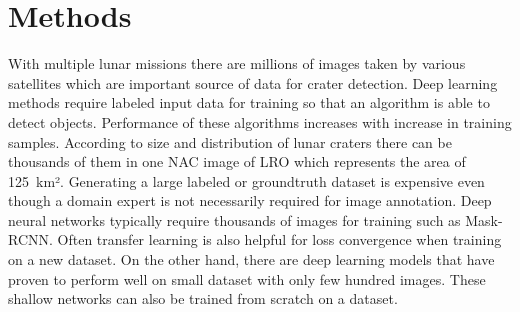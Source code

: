 \documentclass[11pt]{article}
\begin{document}




\section{Methods}
With multiple lunar missions there are millions of images taken by various satellites which are important source of data for crater detection. Deep learning methods require labeled input data for training so that an algorithm is able to detect objects. Performance of these algorithms increases with increase in training samples. According to size and distribution of lunar craters there can be thousands of them in one NAC image of LRO which represents the area of \SI{125}{km}². Generating a large labeled or groundtruth dataset is expensive even though a domain expert is not necessarily required for image annotation. Deep neural networks typically require thousands of images for training such as Mask-RCNN. Often transfer learning is also helpful for loss convergence when training on a new dataset. On the other hand, there are deep learning models that have proven to perform well on small dataset with only few hundred images. These shallow networks can also be trained from scratch on a dataset.
\end{document}
